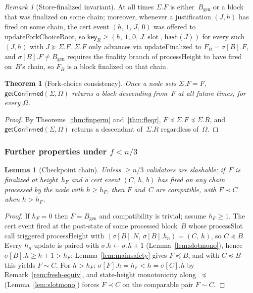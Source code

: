 \ifx\litemode\undefined\documentclass{article}\fi
\newcommand{\genesis}{\ensuremath{B_{\mathrm{gen}}}}
\newcommand{\slot}[0]{\ensuremath{\operatorname{\mathrm{slot}}}}
\newcommand{\hash}{\mathsf{hash}}
\newcommand{\key}{\mathsf{key}}
\newcommand{\processSlot}{\textsf{processSlot}\xspace}
\newcommand{\processHeight}{\textsf{processHeight}\xspace}
\newcommand{\updateForkChoiceRoot}{\textsf{updateForkChoiceRoot}\xspace}
\newcommand{\updateFinalized}{\textsf{updateFinalized}\xspace}
\newcommand{\getConfirmed}{\textsf{getConfirmed}\xspace}
\theoremstyle{plain}
\newtheorem{theorem}{Theorem}
\newtheorem{lemma}{Lemma}
\theoremstyle{definition}
\theoremstyle{remark}
\newtheorem{remark}{Remark}
\begin{document}
\begin{remark}[Store-finalized invariant]\label{rem:fs-invariant}
At all times $\Sigma.F$ is either~$\genesis$ or a block that was finalized on some chain; moreover, whenever a justification $(J, h)$ has fired on some chain, the cert event $(h,\, 1,\, J,\, 0)$ was offered to \updateForkChoiceRoot, so $\key_R \geq (h,\, 1,\, 0,\, J.\slot,\, \hash(J))$ for every such~$(J, h)$ with $J \succeq \Sigma.F$.
$\Sigma.F$ only advances via \updateFinalized to $F_B = \sigma[B].F$, and $\sigma[B].F \neq \genesis$ requires the finality branch of \processHeight to have fired on~$B$'s chain, so $F_B$ is a block finalized on that chain.
\end{remark}

\begin{theorem}[Fork-choice consistency]\label{thm:fcconsistency}
Once a node sets $\Sigma.F = F$, $\getConfirmed(\Sigma, \Omega)$ returns a block descending from~$F$ at all future times, for every $\Omega$.
\end{theorem}

\begin{proof}
By Theorems~\ref{thm:finperm} and~\ref{thm:fleqr}, $F \preceq \Sigma.F \preceq \Sigma.R$, and $\getConfirmed(\Sigma, \Omega)$ returns a descendant of~$\Sigma.R$ regardless of~$\Omega$.
\end{proof}

\subsubsection*{Further properties under $f < n/3$}

\begin{lemma}[Checkpoint chain]\label{lem:certchain}
Unless $\geq n/3$ validators are slashable: if~$F$ is finalized at height~$h_F$ and a cert event $(C,\, h,\, b)$ has fired on any chain processed by the node with $h \geq h_F$, then $F$ and~$C$ are compatible, with $F \prec C$ when $h > h_F$.
\end{lemma}

\begin{proof}
If $h_F = 0$ then $F = \genesis$ and compatibility is trivial; assume $h_F \geq 1$.
The cert event fired at the post-state of some processed block~$B$ whose \processSlot call triggered \processHeight with $(\sigma[B].N,\, \sigma[B].h_n) = (C,\, h)$, so $C \preceq B$.
Every $h_n$-update is paired with $\sigma.h \gets \sigma.h + 1$ (Lemma~\ref{lem:slotmono}), hence $\sigma[B].h \geq h + 1 > h_F$; Lemma~\ref{lem:mainsafety} gives $F \preceq B$, and with $C \preceq B$ this yields $F \sim C$.
For $h > h_F$: $\sigma[F].h = h_F < h = \sigma[C].h$ by Remark~\ref{rem:fresh-equiv}, and state-height monotonicity along~$\preceq$ (Lemma~\ref{lem:slotmono}) forces $F \prec C$ on the comparable pair $F \sim C$.
\end{proof}
\end{document}
